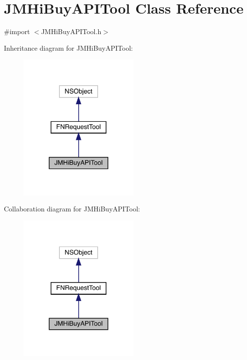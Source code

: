 \hypertarget{interface_j_m_hi_buy_a_p_i_tool}{}\section{J\+M\+Hi\+Buy\+A\+P\+I\+Tool Class Reference}
\label{interface_j_m_hi_buy_a_p_i_tool}


{\ttfamily \#import $<$J\+M\+Hi\+Buy\+A\+P\+I\+Tool.\+h$>$}



Inheritance diagram for J\+M\+Hi\+Buy\+A\+P\+I\+Tool\+:\nopagebreak
\begin{figure}[H]
\begin{center}
\leavevmode
\includegraphics[width=170pt]{interface_j_m_hi_buy_a_p_i_tool__inherit__graph}
\end{center}
\end{figure}


Collaboration diagram for J\+M\+Hi\+Buy\+A\+P\+I\+Tool\+:\nopagebreak
\begin{figure}[H]
\begin{center}
\leavevmode
\includegraphics[width=170pt]{interface_j_m_hi_buy_a_p_i_tool__coll__graph}
\end{center}
\end{figure}
